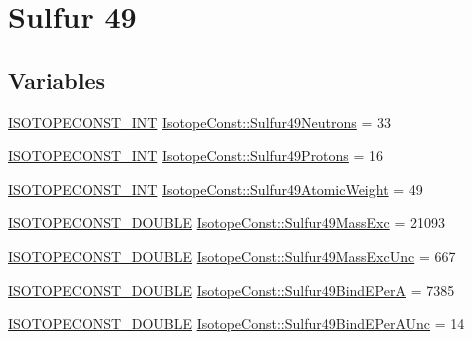 \hypertarget{group___isotope_const-_sulfur-_s49}{}\section{Sulfur 49}
\label{group___isotope_const-_sulfur-_s49}
\subsection*{Variables}
\begin{DoxyCompactItemize}
\item 
\mbox{\hyperlink{group___isotope_const-_macros_ga5f18360b3e99483a35c32d789e62621c}{I\+S\+O\+T\+O\+P\+E\+C\+O\+N\+S\+T\+\_\+\+I\+NT}} \mbox{\hyperlink{group___isotope_const-_sulfur-_s49_ga5979ff15be6582286ef1c0ffa66f0366}{Isotope\+Const\+::\+Sulfur49\+Neutrons}} = 33
\item 
\mbox{\hyperlink{group___isotope_const-_macros_ga5f18360b3e99483a35c32d789e62621c}{I\+S\+O\+T\+O\+P\+E\+C\+O\+N\+S\+T\+\_\+\+I\+NT}} \mbox{\hyperlink{group___isotope_const-_sulfur-_s49_ga7f33f20336454bc312801eb6da73cb18}{Isotope\+Const\+::\+Sulfur49\+Protons}} = 16
\item 
\mbox{\hyperlink{group___isotope_const-_macros_ga5f18360b3e99483a35c32d789e62621c}{I\+S\+O\+T\+O\+P\+E\+C\+O\+N\+S\+T\+\_\+\+I\+NT}} \mbox{\hyperlink{group___isotope_const-_sulfur-_s49_ga9646daeb6f7a2502798435c258e75779}{Isotope\+Const\+::\+Sulfur49\+Atomic\+Weight}} = 49
\item 
\mbox{\hyperlink{group___isotope_const-_macros_ga8f45a7272ce02c0b4c65c44636ed719a}{I\+S\+O\+T\+O\+P\+E\+C\+O\+N\+S\+T\+\_\+\+D\+O\+U\+B\+LE}} \mbox{\hyperlink{group___isotope_const-_sulfur-_s49_ga73a86e7005041c0e1453f3046f4e11c5}{Isotope\+Const\+::\+Sulfur49\+Mass\+Exc}} = 21093
\item 
\mbox{\hyperlink{group___isotope_const-_macros_ga8f45a7272ce02c0b4c65c44636ed719a}{I\+S\+O\+T\+O\+P\+E\+C\+O\+N\+S\+T\+\_\+\+D\+O\+U\+B\+LE}} \mbox{\hyperlink{group___isotope_const-_sulfur-_s49_gafeb36e5348d017eb82d853079950d41d}{Isotope\+Const\+::\+Sulfur49\+Mass\+Exc\+Unc}} = 667
\item 
\mbox{\hyperlink{group___isotope_const-_macros_ga8f45a7272ce02c0b4c65c44636ed719a}{I\+S\+O\+T\+O\+P\+E\+C\+O\+N\+S\+T\+\_\+\+D\+O\+U\+B\+LE}} \mbox{\hyperlink{group___isotope_const-_sulfur-_s49_gaa0f19a58a7fa3b89f318edcf65d5c662}{Isotope\+Const\+::\+Sulfur49\+Bind\+E\+PerA}} = 7385
\item 
\mbox{\hyperlink{group___isotope_const-_macros_ga8f45a7272ce02c0b4c65c44636ed719a}{I\+S\+O\+T\+O\+P\+E\+C\+O\+N\+S\+T\+\_\+\+D\+O\+U\+B\+LE}} \mbox{\hyperlink{group___isotope_const-_sulfur-_s49_gad12f08e99d6f31424652cecd5951838c}{Isotope\+Const\+::\+Sulfur49\+Bind\+E\+Per\+A\+Unc}} = 14

\end{DoxyCompactItemize}
